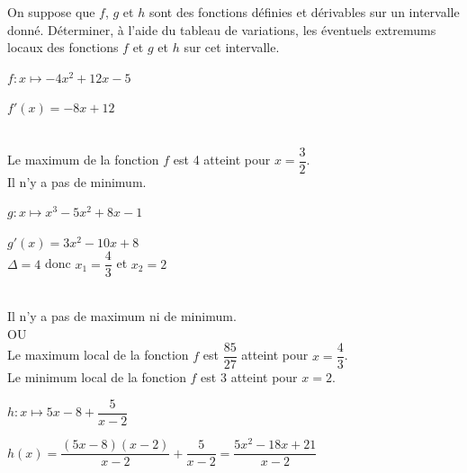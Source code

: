\documentclass[12pt,a4paper]{article}  %
\begin{document}
On suppose que $f$, $g$ et $h$ sont des fonctions définies et dérivables sur un intervalle donné. Déterminer, à l'aide du tableau de variations, les éventuels extremums locaux des fonctions $f$ et $g$ et $h$ sur cet intervalle.
\begin{enumMet}
    \item $f: x \mapsto -4x^{2}+12 x-5$\\
    \begin{corrBox}
        $f'(x)=-8x+12$\\
        \\
    Le maximum de la fonction $f$ est 4 atteint pour $x=\dfrac{3}{2}$.\\
    Il n'y a pas de minimum.
    \end{corrBox}
    \item $g: x \mapsto x^{3}-5 x^{2}+8 x-1$\\
    \begin{corrBox}
        $g'(x)=3x^2-10x+8$\\
        $\Delta=4$ donc $x_1=\dfrac{4}{3}$ et $x_2=2$\\
        \\
    Il n'y a pas de maximum ni de minimum.\\
    OU\\
    Le maximum local de la fonction $f$ est $\dfrac{85}{27}$ atteint pour $x=\dfrac{4}{3}$.\\
    Le minimum local de la fonction $f$ est $3$ atteint pour $x=2$.\\
    \end{corrBox}
    \item {} $h: x \mapsto 5x-8+\dfrac{5}{x-2}$\\
    \begin{corrBox}
        $h(x)=\dfrac{(5x-8)(x-2)}{x-2}+\dfrac{5}{x-2}=\dfrac{5x^2-18x+21}{x-2}$\\

\end{corrBox}
\end{enumMet}
\end{document}
